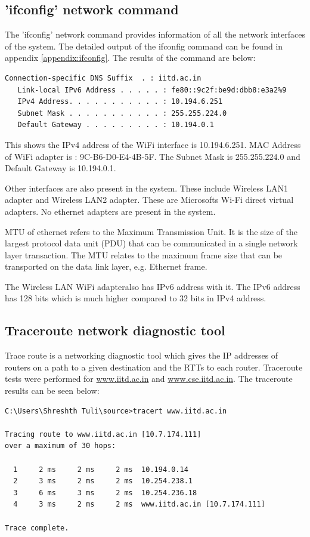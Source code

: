 \documentclass[a4paper, 11pt]{article}
\begin{document}
\subsection{'ifconfig' network command}

The 'ifconfig' network command provides information of all the network interfaces of the system. The detailed output of the ifconfig command can be found in appendix \ref{appendix:ifconfig}. The results of the command are below:

\begin{lstlisting}[style=BashInputStyle]
   Connection-specific DNS Suffix  . : iitd.ac.in
   Link-local IPv6 Address . . . . . : fe80::9c2f:be9d:dbb8:e3a2%9
   IPv4 Address. . . . . . . . . . . : 10.194.6.251
   Subnet Mask . . . . . . . . . . . : 255.255.224.0
   Default Gateway . . . . . . . . . : 10.194.0.1
\end{lstlisting}

This shows the IPv4 address of the WiFi interface is 10.194.6.251. MAC Address of WiFi adapter is : 9C-B6-D0-E4-4B-5F. The Subnet Mask is 255.255.224.0 and Default Gateway is 10.194.0.1.

Other interfaces are also present in the system. These include Wireless LAN1 adapter and Wireless LAN2 adapter. These are Microsofts Wi-Fi direct virtual adapters. No ethernet adapters are present in the system.

MTU of ethernet refers to the Maximum Transmission Unit. It is the size of the largest protocol data unit (PDU) that can be communicated in a single network layer transaction. The MTU relates to the maximum frame size that can be transported on the data link layer, e.g. Ethernet frame.

The Wireless LAN WiFi adapteralso has IPv6 address with it. The IPv6 address has 128 bits which is much higher compared to 32 bits in IPv4 address.


\subsection{Traceroute network diagnostic tool}

Trace route is a networking diagnostic tool which gives the IP addresses of routers on a path to a given destination and the RTTs to each router. Traceroute tests were performed for \url{www.iitd.ac.in} and \url{www.cse.iitd.ac.in}. The traceroute results can be seen below:

\begin{lstlisting}[style=BashInputStyle]
C:\Users\Shreshth Tuli\source>tracert www.iitd.ac.in

Tracing route to www.iitd.ac.in [10.7.174.111]
over a maximum of 30 hops:

  1     2 ms     2 ms     2 ms  10.194.0.14
  2     3 ms     2 ms     2 ms  10.254.238.1
  3     6 ms     3 ms     2 ms  10.254.236.18
  4     3 ms     2 ms     2 ms  www.iitd.ac.in [10.7.174.111]

Trace complete.
\end{lstlisting} 
\end{document}
